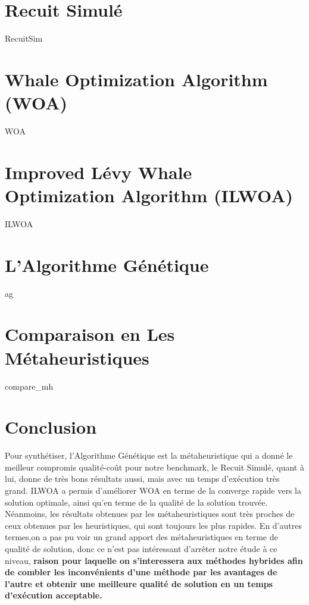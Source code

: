 \documentclass[12pt,a4paper, titlepage]{report}
\begin{document}
    \section{Recuit Simulé }
    {RecuitSim}
    \section{Whale Optimization Algorithm (WOA)}
    {WOA}
    \section{Improved Lévy Whale Optimization Algorithm (ILWOA)}
    {ILWOA}
    \section{L'Algorithme Génétique}
    {ag}
    \section{Comparaison en Les Métaheuristiques}
    {compare_mh}
    \section{Conclusion}
    Pour synthétiser, l’Algorithme Génétique est la métaheuristique qui a donné le meilleur compromis qualité-coût pour notre benchmark, le Recuit Simulé, quant à lui, donne de très bons résultats aussi, mais avec un temps d'exécution très grand. ILWOA a permis d’améliorer WOA en terme de la converge rapide vers la solution optimale, ainsi qu’en terme de la qualité de la solution trouvée. Néanmoins, les résultats obtenues par les métaheuristiques sont très proches de ceux obtenues par les heuristiques, qui sont toujours les plus rapides. En d’autres termes,on a pas pu voir un grand apport des métaheuristiques en terme de qualité de solution, donc ce n’est pas intéressant d’arrêter notre étude à ce niveau, \textbf{raison pour laquelle on s’interessera aux méthodes hybrides afin de combler les inconvénients d’une méthode par les avantages de l’autre et obtenir une meilleure qualité de solution en un temps d'exécution acceptable.}
\end{document}

